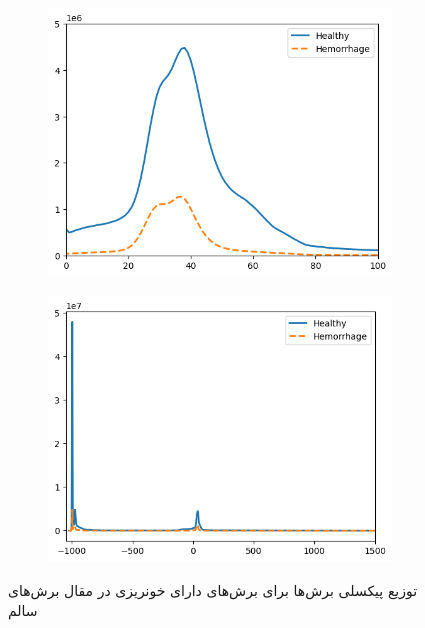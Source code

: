 \begin{figure}[ht]
		\centering %
		\begin{subfigure}{0.45\textwidth}
			\includegraphics[width=\linewidth]{Images/Chapter2/Pixel histogram.png}
			\caption{}
			\label{fig: ch2-slice hist lim}
		\end{subfigure}\hfil %
		\begin{subfigure}{0.45\textwidth}
			\includegraphics[width=\linewidth,]{Images/Chapter2/Pixel histogram lim.png}
			\caption{}
			\label{fig: ch2-slice hist whole}
		\end{subfigure}
			\caption{توزیع پیکسلی برش‌ها برای برش‌های دارای خونریزی در مقال برش‌های سالم}
		\label{fig: ch2-slice hist}
\end{figure} 

